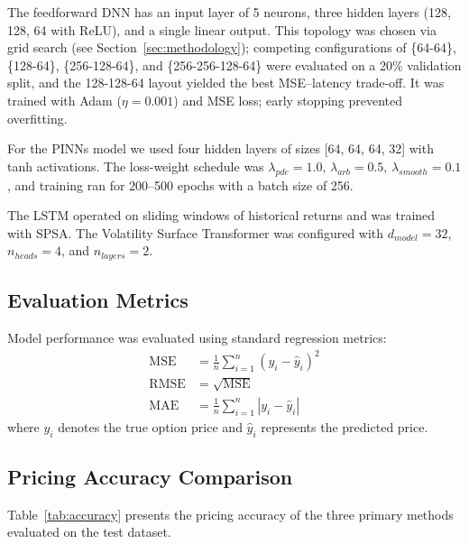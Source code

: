 \documentclass[conference]{IEEEtran}
\begin{document}
The feedforward DNN has an input layer of 5 neurons, three hidden layers (128, 128, 64 with ReLU), and a single linear output. This topology was chosen via grid search (see Section~\ref{sec:methodology}); competing configurations of \{64-64\}, \{128-64\}, \{256-128-64\}, and \{256-256-128-64\} were evaluated on a 20\% validation split, and the 128-128-64 layout yielded the best MSE--latency trade-off. It was trained with Adam ($\eta = 0.001$) and MSE loss; early stopping prevented overfitting.

For the PINNs model we used four hidden layers of sizes [64, 64, 64, 32] with tanh activations. The loss-weight schedule was $\lambda_{pde} = 1.0$, $\lambda_{arb} = 0.5$, $\lambda_{smooth} = 0.1$, and training ran for 200--500 epochs with a batch size of 256.

The LSTM operated on sliding windows of historical returns and was trained with SPSA. The Volatility Surface Transformer was configured with $d_{model}=32$, $n_{heads}=4$, and $n_{layers}=2$.

\subsection{Evaluation Metrics}

Model performance was evaluated using standard regression metrics:
\begin{align}
    \text{MSE} &= \frac{1}{n}\sum_{i=1}^{n}(y_i - \hat{y}_i)^2 \label{eq:mse} \\
    \text{RMSE} &= \sqrt{\text{MSE}} \label{eq:rmse} \\
    \text{MAE} &= \frac{1}{n}\sum_{i=1}^{n}|y_i - \hat{y}_i| \label{eq:mae}
\end{align}
where $y_i$ denotes the true option price and $\hat{y}_i$ represents the predicted price.

\subsection{Pricing Accuracy Comparison}

Table~\ref{tab:accuracy} presents the pricing accuracy of the three primary methods evaluated on the test dataset.
\end{document}
